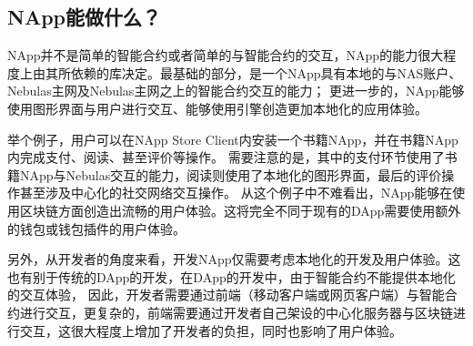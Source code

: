 \subsection{NApp能做什么？}
NApp并不是简单的智能合约或者简单的与智能合约的交互，NApp的能力很大程度上由其所依赖的库决定。最基础的部分，是一个NApp具有本地的与NAS账户、Nebulas主网及Nebulas主网之上的智能合约交互的能力；
更进一步的，NApp能够使用图形界面与用户进行交互、能够使用引擎创造更加本地化的应用体验。

举个例子，用户可以在NApp Store Client内安装一个书籍NApp，并在书籍NApp内完成支付、阅读、甚至评价等操作。
需要注意的是，其中的支付环节使用了书籍NApp与Nebulas交互的能力，阅读则使用了本地化的图形界面，最后的评价操作甚至涉及中心化的社交网络交互操作。
从这个例子中不难看出，NApp能够在使用区块链方面创造出流畅的用户体验。这将完全不同于现有的DApp需要使用额外的钱包或钱包插件的用户体验。

另外，从开发者的角度来看，开发NApp仅需要考虑本地化的开发及用户体验。这也有别于传统的DApp的开发，在DApp的开发中，由于智能合约不能提供本地化的交互体验，
因此，开发者需要通过前端（移动客户端或网页客户端）与智能合约进行交互，更复杂的，前端需要通过开发者自己架设的中心化服务器与区块链进行交互，这很大程度上增加了开发者的负担，同时也影响了用户体验。
